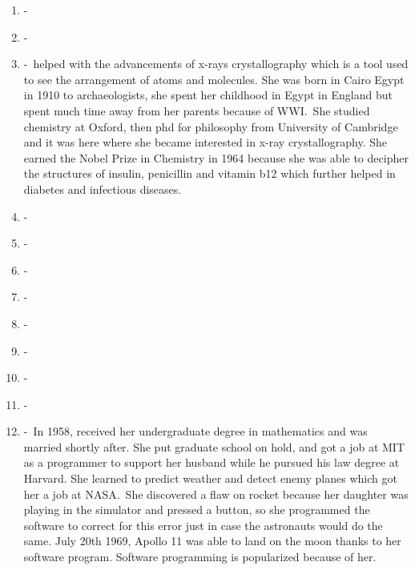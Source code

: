 \documentclass[12pt,a4paper]{article}
\begin{document}
\begin{enumerate}
    \item {} -\  
    \item {} -\ 
    \item {} -\ helped with the advancements of x-rays crystallography which is a tool used to see the arrangement of atoms and molecules. She was born in Cairo Egypt in 1910 to archaeologists, she spent her childhood in Egypt in England but spent much time away from her parents because of WWI.\ She studied chemistry at Oxford, then phd for philosophy from University of Cambridge and it was here where she became interested in x-ray crystallography. She earned the Nobel Prize in Chemistry in 1964 because she was able to decipher the structures of insulin, penicillin and vitamin b12 which further helped in diabetes and infectious diseases.
    \item {} -\  
    \item {} -\  
    \item {} -\ 
    \item {} -\  
    \item {} -\  
    \item {} -\  
    \item {} -\  
    \item {} -\ 
    \item {} -\ In 1958, received her undergraduate degree in mathematics and was married shortly after. She put graduate school on hold, and got a job at MIT as a programmer to support her husband while he pursued his law degree at Harvard. She learned to predict weather and detect enemy planes which got her a job at NASA.\ She discovered a flaw on rocket because her daughter was playing in the simulator and pressed a button, so she programmed the software to correct for this error just in case the astronauts would do the same. July 20th 1969, Apollo 11 was able to land on the moon thanks to her software program. Software programming is popularized because of her. \href{https://www.wired.com/2015/10/margaret-hamilton-nasa-apollo/}{}

\end{enumerate}
\end{document}
